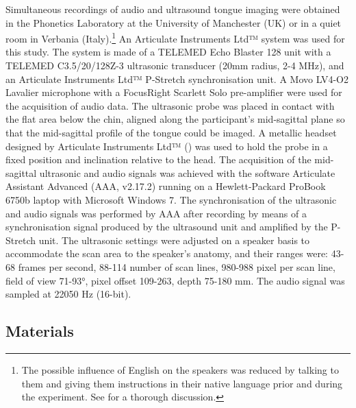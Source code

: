 \documentclass[preprint]{JASAnew}
\begin{document}
Simultaneous recordings of audio and ultrasound tongue imaging were
obtained in the Phonetics Laboratory at the University of Manchester
(UK) or in a quiet room in Verbania
(Italy).\footnote{The possible influence of English on the speakers was reduced by talking to them and giving them instructions in their native language prior and during the experiment. See \citet{coretta2019k} for a thorough discussion.}
An Articulate Instruments Ltd™ system was used for this study. The
system is made of a TELEMED Echo Blaster 128 unit with a TELEMED
C3.5/20/128Z-3 ultrasonic transducer (20mm radius, 2-4 MHz), and an
Articulate Instruments Ltd™ P-Stretch synchronisation unit. A Movo
LV4-O2 Lavalier microphone with a FocusRight Scarlett Solo pre-amplifier
were used for the acquisition of audio data. The ultrasonic probe was
placed in contact with the flat area below the chin, aligned along the
participant's mid-sagittal plane so that the mid-sagittal profile of the
tongue could be imaged. A metallic headset designed by Articulate
Instruments Ltd™ (\citeyear{articulate2008}) was used to hold the probe
in a fixed position and inclination relative to the head. The
acquisition of the mid-sagittal ultrasonic and audio signals was
achieved with the software Articulate Assistant Advanced (AAA, v2.17.2)
running on a Hewlett-Packard ProBook 6750b laptop with Microsoft Windows
7. The synchronisation of the ultrasonic and audio signals was performed
by AAA after recording by means of a synchronisation signal produced by
the ultrasound unit and amplified by the P-Stretch unit. The ultrasonic
settings were adjusted on a speaker basis to accommodate the scan area
to the speaker's anatomy, and their ranges were: 43-68 frames per
second, 88-114 number of scan lines, 980-988 pixel per scan line, field
of view 71-93°, pixel offset 109-263, depth 75-180 mm. The audio signal
was sampled at 22050 Hz (16-bit).

\hypertarget{materials}{%
\subsection{Materials}\label{materials}}
\end{document}
